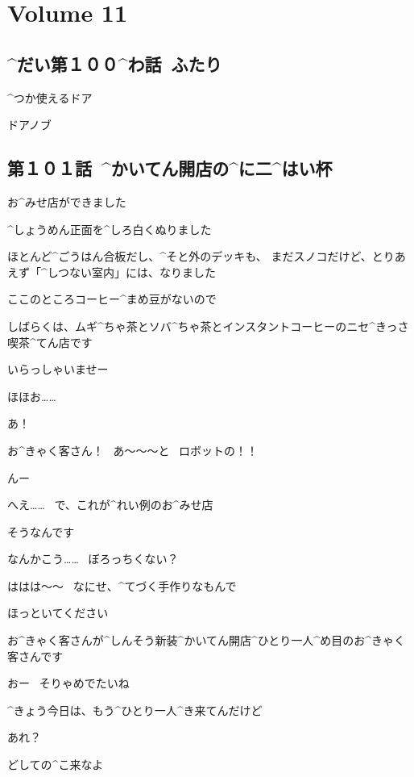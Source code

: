 \section{Volume 11}

\subsection{^{だい}{第}１００^{わ}{話}\ ふたり}

\page[3]
\Sign ^{つか}{使}えるドア

\Sign ドアノブ


\subsection{第１０１話\ ^{かいてん}{開店}の^{に}{二}^{はい}{杯}}

\page[10]
\Alpha お^{みせ}{店}ができました

\Alpha ^{しょうめん}{正面}を^{しろ}{白}くぬりました

\page
\Alpha ほとんど^{ごうはん}{合板}だし、^{そと}{外}のデッキも、
まだスノコだけど、とりあえず「^{しつない}{室内}」には、なりました

\Alpha ここのところコーヒー^{まめ}{豆}がないので

\Alpha しばらくは、ムギ^{ちゃ}{茶}とソバ^{ちゃ}{茶}とインスタントコーヒーのニセ^{きっさ}{喫茶}^{てん}{店}です

\page[14]
\Alpha いらっしゃいませー

\Maruko ほほお……

\Alpha あ！

\Alpha お^{きゃく}{客}さん！
\ あ〜〜〜と
\ ロボットの！！

\Maruko んー

\Maruko へえ……
\ で、これが^{れい}{例}のお^{みせ}{店}

\Alpha そうなんです

\page
\Maruko なんかこう……
\ ぼろっちくない？

\Alpha ははは〜〜
\ なにせ、^{てづく}{手作}りなもんで

\Alpha ほっといてください

\Alpha お^{きゃく}{客}さんが^{しんそう}{新装}^{かいてん}{開店}^{ひとり}{一人}^{め}{目}のお^{きゃく}{客}さんです

\Maruko おー
\ そりゃめでたいね

\Maruko ^{きょう}{今日}は、もう^{ひとり}{一人}^{き}{来}てんだけど

\Maruko あれ？

\Maruko どしての^{こ}{来}なよ

